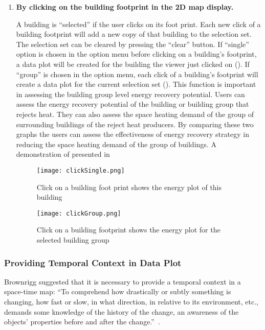\begin{enumerate}[1)]
\item \textbf{By clicking on the building footprint in the 2D map
    display.}

  A building is ``selected'' if the user clicks on its foot
  print. Each new click of a building footprint will add a new copy of
  that building to the selection set. The selection set can be cleared
  by pressing the ``clear'' button. If ``single'' option is chosen in
  the option menu before clicking on a building's footprint, a data
  plot will be created for the building the viewer just clicked on
  (). If ``group'' is chosen in the option menu,
  each click of a building's footprint will create a data plot for the
  current selection set (). This function is
  important in assessing the building group level energy recovery
  potential. Users can assess the energy recovery potential of the
  building or building group that rejects heat. They can also assess
  the space heating demand of the group of surrounding buildings of
  the reject heat producers. By comparing these two graphs the users
  can assess the effectiveness of energy recovery strategy in reducing
  the space heating demand of the group of buildings. A demonstration
  of presented in 
  
  \begin{figure}[h!]
    \centering
    \texttt{[image: clickSingle.png]}
    \caption[Show Plot for One Building]{Click on a building foot
      print shows the energy plot of this building}
    \label{fig:clickSingle}
  \end{figure}

  \begin{figure}[h!]
    \centering
    \texttt{[image: clickGroup.png]}
    \caption[Show Plot for a Group of Buildings]{Click on a building
      footprint shows the energy plot for the selected building group}
    \label{fig:clickGroup}
  \end{figure}

\end{enumerate}

\subsubsection{Providing Temporal Context in Data Plot}

Brownrigg suggested that it is necessary to provide a temporal context
in a space-time map: ``To comprehend how drastically or subtly
something is changing, how fast or slow, in what direction, in
relative to its environment, etc., demands some knowledge of the
history of the change, an awareness of the objects' properties before
and after the change.''~\cite{Brownrigg2005}.

